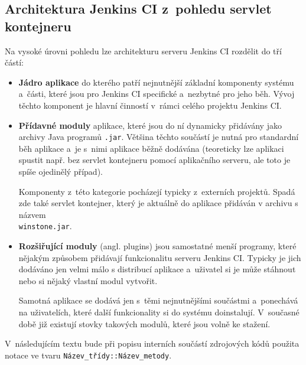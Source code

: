         \subsection{Architektura Jenkins CI z~pohledu servlet kontejneru} 
            Na vysoké úrovni pohledu lze architekturu serveru Jenkins CI rozdělit do tří částí:
            
            \begin{itemize}
                \item{\textbf{Jádro aplikace} do kterého patří nejnutnější základní komponenty systému
                    a~části, které jsou pro Jenkins CI specifické a~nezbytné pro jeho běh. 
                    Vývoj těchto komponent je hlavní činností v~rámci celého projektu Jenkins CI.}

                \item{\textbf{Přídavné moduly} aplikace, které jsou do ní dynamicky přidávány jako archivy Java programů
                    \texttt{.jar}. Většina těchto součástí je nutná pro standardní běh aplikace a~je s~nimi aplikace
                    běžně dodávána (teoreticky lze
                    aplikaci spustit např. bez servlet kontejneru pomocí aplikačního serveru, ale toto je spíše ojedinělý případ). 
                    
                    Komponenty z~této kategorie pocházejí typicky z~externích projektů.
                    Spadá zde také servlet kontejner, který je aktuálně do aplikace
                    přidáván v archivu s názvem \\\texttt{winstone.jar}.}

                \item{\textbf{Rozšiřující moduly} (angl. plugins) jsou samostatné menší programy, které nějakým
                    způsobem přidávají funkcionalitu serveru Jenkins CI. Typicky je jich dodáváno jen velmi málo s 
                    distribucí aplikace 
                    a~uživatel si je může stáhnout nebo si nějaký vlastní modul vytvořit.
                    
                    Samotná aplikace se dodává jen s~těmi nejnutnějšími součástmi a~ponechává na uživatelích, které
                    další funkcionality si do systému doinstalují. V~současné době již existují stovky takových
                    modulů, které jsou volně ke stažení. }
            \end{itemize}
            

            V~následujícím textu bude při popisu interních součástí zdrojových kódů použita notace
            ve tvaru \texttt{Název\_třídy::Název\_metody}.

